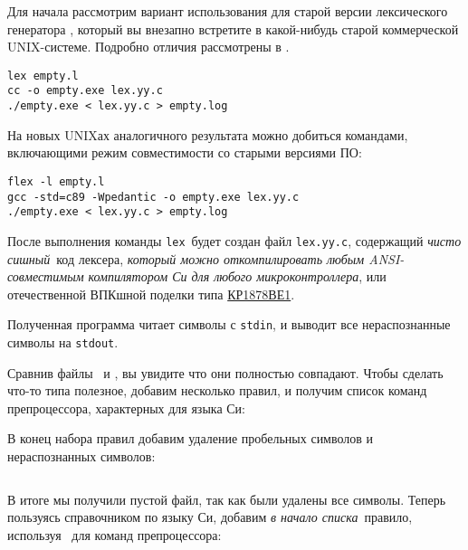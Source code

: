 Для начала рассмотрим вариант использования для старой версии
лексического генератора , который вы внезапно встретите
в какой-нибудь старой коммерческой UNIX-системе. Подробно отличия 
рассмотрены в \cite{lextoflex}.


\begin{verbatim}
lex empty.l
cc -o empty.exe lex.yy.c
./empty.exe < lex.yy.c > empty.log 
\end{verbatim}

На новых UNIXах аналогичного результата можно добиться командами, 
включающими режим совместимости со старыми версиями ПО:

\begin{verbatim}
flex -l empty.l
gcc -std=c89 -Wpedantic -o empty.exe lex.yy.c
./empty.exe < lex.yy.c > empty.log 
\end{verbatim}

После выполнения команды \verb|lex|\ будет создан 
файл \verb|lex.yy.c|, содержащий \emph{чисто сишный}\ код лексера, 
\emph{который можно откомпилировать любым ANSI-совместимым компилятором Си
для любого микроконтроллера}, или отечественной ВПКшной поделки типа 
\href{http://www.angstrem.ru/products/micro/tesey-8/KP1878BE1.html}{КР1878ВЕ1}.

\begin{framed}
Полученная программа читает символы с \verb|stdin|, и выводит все 
нераспознанные символы на \verb|stdout|.
\end{framed}

Сравнив файлы \ и , вы увидите что они 
полностью совпадают. Чтобы сделать что-то типа полезное, добавим несколько
правил, и получим список команд препроцессора, характерных для языка Си:

В конец набора правил добавим удаление пробельных символов 
и нераспознанных символов:


\begin{lstlisting}[title=empty.log]
\end{lstlisting}

В итоге мы получили пустой файл, так как были удалены все символы.
Теперь пользуясь справочником по языку Си, 
добавим \emph{в начало списка}\ правило,
используя \ для команд препроцессора:



